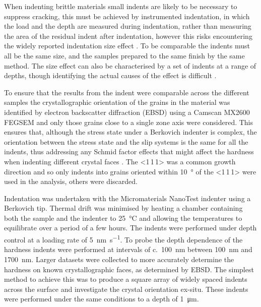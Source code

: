 When indenting brittle materials small indents are likely to be necessary to suppress cracking, this must be achieved by instrumented indentation, in which the load and the depth are measured during indentation, rather than measuring the area of the residual indent after indentation, however this risks encountering the widely reported indentation size effect \cite{Korte2009,Cripps2011}. To be comparable the indents must all be the same size, and the samples prepared to the same finish by the same method. The size effect can also be characterised by a set of indents at a range of depths, though identifying the actual causes of the effect is difficult \cite{Korte2009,Cripps2011}.






To ensure that the results from the indent were comparable across the different samples the crystallographic orientation of the grains in the material was identified by electron backscatter diffraction (EBSD) using a Camscan MX2600 FEGSEM and only those grains close to a single zone axis were considered. This ensures that, although the stress state under a Berkovich indenter is complex, the orientation between the stress state and the slip systems is the same for all the indents, thus addressing any Schmid factor effects that might affect the hardness when indenting different crystal faces \cite{Kelly2012ch7}. The <1\,1\,1> was a common growth direction and so only indents into grains oriented within \SI{10}{\degree} of the <1\,1\,1> were used in the analysis, others were discarded.


Indentation was undertaken with the Micromaterials NanoTest indenter using a Berkovich tip. Thermal drift was minimised by heating a chamber containing both the sample and the indenter to \SI{25}{\celsius} and allowing the temperatures to equilibrate over a period of a few hours. The indents were performed under depth control at a loading rate of \SI{5}{\nano\meter\per\second}. To probe the depth dependence of the hardness indents were performed at intervals of c.~\SI{100}{\nano\meter} between \SI{100}{\nano\meter} and \SI{1700}{\nano\meter}. Larger datasets were collected to more accurately determine the hardness on known crystallographic faces, as determined by EBSD. The simplest method to achieve this was to produce a square array of widely spaced indents across the surface and investigate the crystal orientation ex-situ. These indents were performed under the same conditions to a depth of \SI{1}{\micro\meter}.

